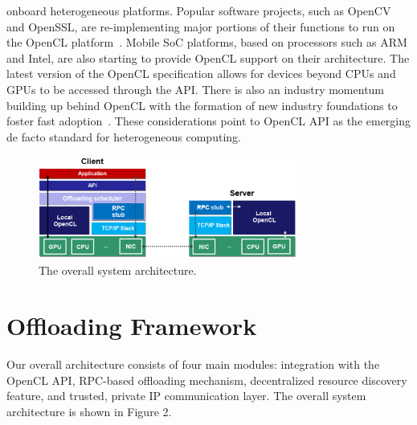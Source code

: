 \documentclass[10pt, conference, compsocconf]{IEEEtran}
\begin{document}
onboard heterogeneous platforms.
%
Popular software projects, such as OpenCV and OpenSSL, are re-implementing
major portions of their functions to run on the OpenCL
platform~\cite{opencv}.
%
Mobile SoC platforms, based on processors such as ARM and Intel, are also 
starting to provide OpenCL support on their architecture.
%
The latest version of the OpenCL specification allows for devices beyond 
CPUs and GPUs to be accessed through the API. 
%
There is also an industry momentum building up behind OpenCL with the
formation of new industry foundations to foster fast adoption~\cite{hsa}. 
%
These considerations point to OpenCL API as the emerging de facto standard 
for heterogeneous computing.
%
\begin{figure}
\centering
\includegraphics[height=3.4cm, width=8.5cm]{Figure/architecture}
\caption{The overall system architecture.}
\end{figure}
%
\section{Offloading Framework}
%
Our overall architecture consists of four main modules: integration with the 
OpenCL API, RPC-based offloading mechanism, decentralized resource discovery 
feature, and trusted, private IP communication layer.
%
The overall system architecture is shown in Figure 2.
%
\end{document}
